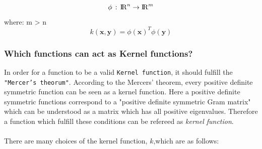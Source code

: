 \begin{equation}
\phi \, : \, {\rm I\!R}^n \to {\rm I\!R}^m
\end{equation}
where: m > n\\
\begin{equation}
k(\mathbf x, \mathbf y) = \phi(\mathbf x)^T \phi(\mathbf y) 
\end{equation}
\subsubsection{Which functions can act as Kernel functions?}
In order for a function to be a valid \texttt{Kernel function}, it should fulfill the \texttt{"Mercer's theorum"}. According to the Mercers' theorem, every positive definite symmetric function can be seen as a kernel function. Here a positive definite symmetric functions correspond to a "positive definite symmetric Gram matrix" which can be understood as a matrix which has all positive eigenvalues. Therefore a function which fulfill these conditions can be refereed as \textit{kernel function}.\\\\
There are many choices of the kernel function, $\mathit{k}$,which are as follows:\\
